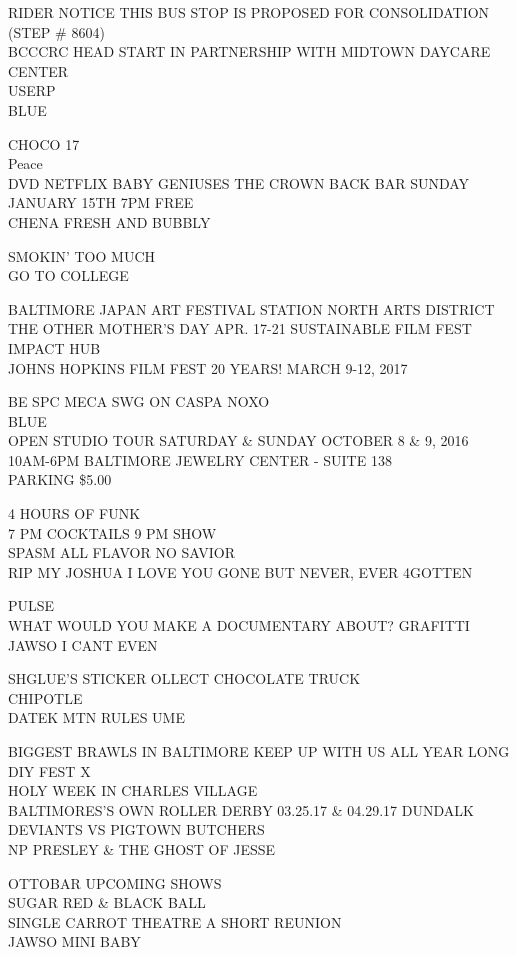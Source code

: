 \documentclass[10pt,letterpaper]{article}
\begin{document}
RIDER NOTICE THIS BUS STOP IS PROPOSED FOR CONSOLIDATION (STEP \# 8604)\\
BCCCRC HEAD START IN PARTNERSHIP WITH MIDTOWN DAYCARE CENTER\\
USERP\\
BLUE

CHOCO 17\\
Peace\\
DVD NETFLIX BABY GENIUSES THE CROWN BACK BAR SUNDAY JANUARY 15TH 7PM FREE\\
CHENA FRESH AND BUBBLY

SMOKIN' TOO MUCH\\
GO TO COLLEGE

BALTIMORE JAPAN ART FESTIVAL STATION NORTH ARTS DISTRICT\\
THE OTHER MOTHER'S DAY APR. 17{-}21 SUSTAINABLE FILM FEST\\
IMPACT HUB\\
JOHNS HOPKINS FILM FEST 20 YEARS!  MARCH 9{-}12, 2017

BE SPC MECA SWG ON CASPA NOXO\\
BLUE\\
OPEN STUDIO TOUR SATURDAY \& SUNDAY OCTOBER 8 \& 9, 2016 10AM{-}6PM BALTIMORE JEWELRY CENTER {-} SUITE 138\\
PARKING \$5.00

4 HOURS OF FUNK\\
7 PM COCKTAILS 9 PM SHOW\\
SPASM ALL FLAVOR NO SAVIOR\\
RIP MY JOSHUA I LOVE YOU GONE BUT NEVER, EVER 4GOTTEN

PULSE\\
WHAT WOULD YOU MAKE A DOCUMENTARY ABOUT?  GRAFITTI\\
JAWSO I CANT EVEN

SHGLUE'S STICKER OLLECT CHOCOLATE TRUCK\\
CHIPOTLE\\
DATEK MTN RULES UME

BIGGEST BRAWLS IN BALTIMORE KEEP UP WITH US ALL YEAR LONG DIY FEST X\\
HOLY WEEK IN CHARLES VILLAGE\\
BALTIMORES'S OWN ROLLER DERBY 03.25.17 \& 04.29.17 DUNDALK DEVIANTS VS PIGTOWN BUTCHERS\\
NP PRESLEY \& THE GHOST OF JESSE

OTTOBAR UPCOMING SHOWS\\
SUGAR RED \& BLACK BALL\\
SINGLE CARROT THEATRE A SHORT REUNION\\
JAWSO MINI BABY
\end{document}
